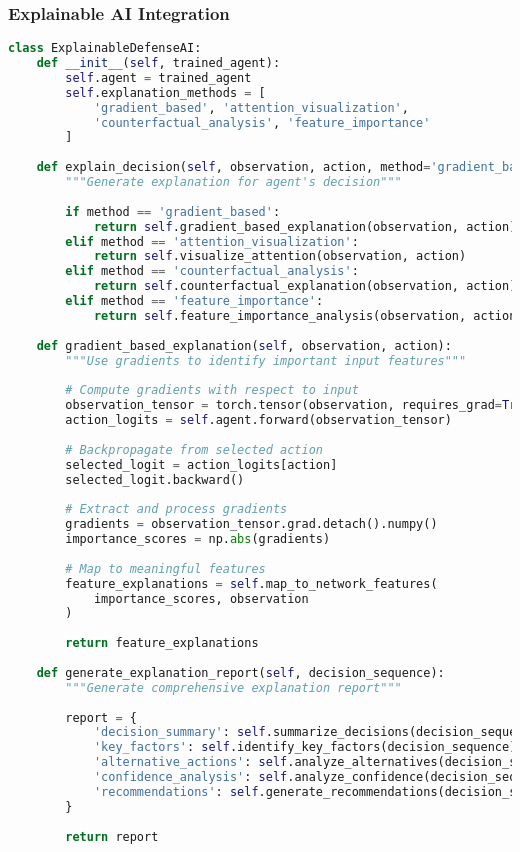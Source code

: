 \documentclass[12pt,a4paper]{article}
\begin{document}
\subsubsection{Explainable AI Integration}
\begin{lstlisting}[language=Python, caption=Explainable AI Framework]
class ExplainableDefenseAI:
    def __init__(self, trained_agent):
        self.agent = trained_agent
        self.explanation_methods = [
            'gradient_based', 'attention_visualization', 
            'counterfactual_analysis', 'feature_importance'
        ]
    
    def explain_decision(self, observation, action, method='gradient_based'):
        """Generate explanation for agent's decision"""
        
        if method == 'gradient_based':
            return self.gradient_based_explanation(observation, action)
        elif method == 'attention_visualization':
            return self.visualize_attention(observation, action)
        elif method == 'counterfactual_analysis':
            return self.counterfactual_explanation(observation, action)
        elif method == 'feature_importance':
            return self.feature_importance_analysis(observation, action)
    
    def gradient_based_explanation(self, observation, action):
        """Use gradients to identify important input features"""
        
        # Compute gradients with respect to input
        observation_tensor = torch.tensor(observation, requires_grad=True)
        action_logits = self.agent.forward(observation_tensor)
        
        # Backpropagate from selected action
        selected_logit = action_logits[action]
        selected_logit.backward()
        
        # Extract and process gradients
        gradients = observation_tensor.grad.detach().numpy()
        importance_scores = np.abs(gradients)
        
        # Map to meaningful features
        feature_explanations = self.map_to_network_features(
            importance_scores, observation
        )
        
        return feature_explanations
    
    def generate_explanation_report(self, decision_sequence):
        """Generate comprehensive explanation report"""
        
        report = {
            'decision_summary': self.summarize_decisions(decision_sequence),
            'key_factors': self.identify_key_factors(decision_sequence),
            'alternative_actions': self.analyze_alternatives(decision_sequence),
            'confidence_analysis': self.analyze_confidence(decision_sequence),
            'recommendations': self.generate_recommendations(decision_sequence)
        }
        
        return report
\end{lstlisting}
\end{document}
